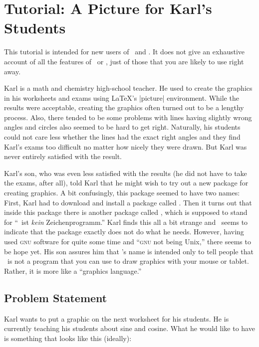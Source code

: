 \section{Tutorial: A Picture for Karl's Students}

This tutorial is intended for new users of \pgfname\ and \tikzname. It
does not give an exhaustive account of all the features of \tikzname\ or
\pgfname, just of those that you are likely to use right away.

Karl is a math and chemistry high-school teacher. He used to create
the graphics in his worksheets and exams using \LaTeX's |{picture}|
environment. While the results were acceptable, creating the graphics
often turned out to be a lengthy process. Also, there tended to be
some problems with lines having slightly wrong angles and circles also
seemed to be hard to get right. Naturally, his students could not care
less whether the lines had the exact right angles and they find
Karl's exams too difficult no matter how nicely they were drawn. But
Karl was never entirely satisfied with the result.

Karl's son, who was even less satisfied with the results (he did not
have to take the exams, after all),  told Karl that he might wish
to try out a new package for creating graphics. A bit confusingly,
this package seemed to have two names: First, Karl had to download and 
install a package called \pgfname. Then it turns out that inside this
package there is another package called \tikzname, which is supposed to
stand for ``\tikzname\ ist \emph{kein}  Zeichenprogramm.'' Karl finds this
all a bit strange and \tikzname\ seems to indicate that the package
exactly does not do what he needs. However, having used \textsc{gnu}
software for quite some time and ``\textsc{gnu} not being Unix,''
there seems to be hope yet. His son assures him that \tikzname's name is
intended only to tell people that \tikzname\ is not a program that you can
use to draw graphics with your mouse or tablet. Rather, it is more
like a ``graphics language.''


\subsection{Problem Statement}

Karl wants to put a graphic on the next worksheet for his
students. He is currently teaching his students about sine and
cosine. What he would like to have is something that looks like this
(ideally):

